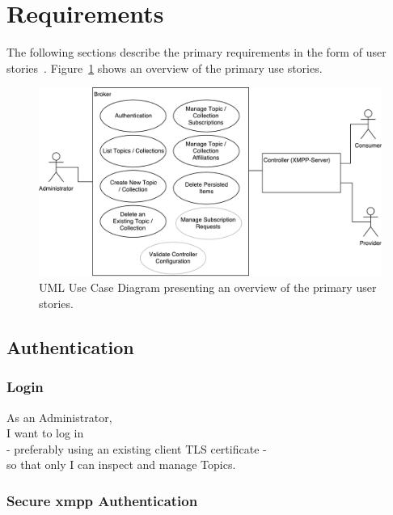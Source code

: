 
\section{Requirements}\label{sec:requirements}

The following sections describe the primary requirements in the form of user stories~\cite{agile-alliance-user-stories}.
Figure~\ref{fig:requirements-overview} shows an overview of the primary use stories.

\begin{figure}[h]
    \centering
    \includegraphics[width=1\linewidth]{resources/requirements_overview}
    \caption{UML Use Case Diagram presenting an overview of the primary user stories.}
    \label{fig:requirements-overview}
\end{figure}

\subsection{Authentication}
\subsubsection{Login}

As an Administrator,\\
I want to log in\\
- preferably using an existing client TLS certificate - \\
so that only I can inspect and manage Topics.\\

\subsubsection{Secure \gls{xmpp} Authentication}

